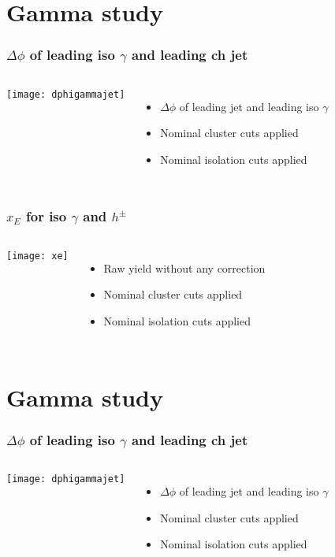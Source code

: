 

\section{Gamma study}


\begin{frame}
\frametitle{$\Delta \phi$ of leading iso $\gamma$ and leading ch jet }
\begin{columns}[c]
\centering
\texttt{[image: dphigammajet]}\\
\begin{itemize}
\item $\Delta \phi$ of leading jet and leading iso $\gamma$
\item Nominal cluster cuts applied
\item Nominal isolation cuts applied
\end{itemize}
\end{columns}
\end{frame}

\begin{frame}
\frametitle{$x_E$ for iso $\gamma$ and $h^{\pm}$ }
\begin{columns}[c]
\centering
\texttt{[image: xe]}\\
\begin{itemize}
\item Raw yield without any correction
\item Nominal cluster cuts applied
\item Nominal isolation cuts applied
\end{itemize}
\end{columns}
\end{frame}






\section{Gamma study}


\begin{frame}
\frametitle{$\Delta \phi$ of leading iso $\gamma$ and leading ch jet }
\begin{columns}[c]
\centering
\texttt{[image: dphigammajet]}\\
\begin{itemize}
\item $\Delta \phi$ of leading jet and leading iso $\gamma$
\item Nominal cluster cuts applied
\item Nominal isolation cuts applied
\end{itemize}
\end{columns}
\end{frame}

